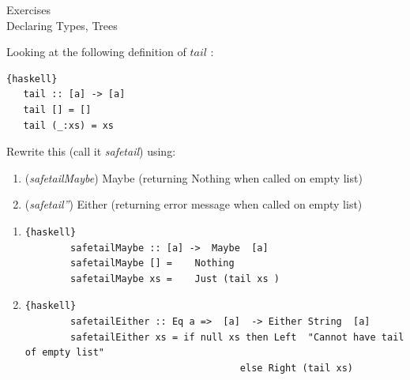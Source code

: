 \documentclass{article}
\newcommand\ExTitle{Declaring Types, Trees}
\newcommand\fullExTitle{Exercises \\ \ExTitle }
\begin{document}
\begin{Huge}
	\begin{center}
	\fullExTitle
	\end{center}
\end{Huge}

\begin{exercise}
  Looking at the following  definition of $tail$ :\\
  
  \begin{lstlisting}{haskell}
   tail :: [a] -> [a]
   tail [] = []
   tail (_:xs) = xs
  \end{lstlisting}
  Rewrite this (call it \textit{safetail}) using: 
  \begin{enumerate}
    \item (\textit {safetailMaybe}) Maybe (returning Nothing when called on empty list)
    \item (\textit {safetail''}) Either (returning error message when called on empty list)
  \end{enumerate}
  \end{exercise}
  \begin{solution}
    \begin{enumerate}
     \item 
      \begin{lstlisting}{haskell}
        safetailMaybe :: [a] ->  Maybe  [a]
        safetailMaybe [] =    Nothing
        safetailMaybe xs =    Just (tail xs )
      \end{lstlisting}
  
      \item     
      \begin{lstlisting}{haskell}
        safetailEither :: Eq a =>  [a]  -> Either String  [a]
        safetailEither xs = if null xs then Left  "Cannot have tail of empty list"
                                      else Right (tail xs)
  \end{lstlisting}
  \end{enumerate}
  \end{solution}
\end{document}
